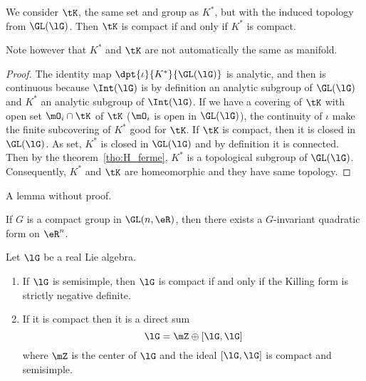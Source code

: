 \begin{proposition}
We consider $\tK$, the same set and group as $K^*$, but with the induced topology from $\GL(\lG)$. Then $\tK$ is compact if and only if $K^*$ is compact.
\end{proposition}

Note however that $K^*$ and $\tK$ are not automatically the same as manifold.

\begin{proof}
The identity map $\dpt{\iota}{K^*}{\GL(\lG)}$ is analytic, and then is continuous because $\Int(\lG)$ is by definition an analytic subgroup of $\GL(\lG)$ and $K^*$ an analytic subgroup of $\Int(\lG)$. If we have a covering of $\tK$ with open set $\mO_i\cap\tK$ of $\tK$ ($\mO_i$ is open in $\GL(\lG)$), the continuity of $\iota$ make the finite subcovering of $K^*$ good for $\tK$.
If $\tK$ is compact, then it is closed in $\GL(\lG)$. As set, $K^*$ is closed in $\GL(\lG)$ and by definition it is connected. Then by the theorem~\ref{tho:H_ferme}, $K^*$ is a topological subgroup of $\GL(\lG)$. Consequently, $K^*$ and $\tK$ are homeomorphic and they have same topology.
\end{proof}

A lemma without proof.
\begin{lemma}
If $G$ is a compact group in $\GL(n,\eR)$, then there exists a $G$-invariant quadratic form on $\eR^n$.
\end{lemma}

\begin{proposition}     \label{ProplGcompactKillNeg}
Let $\lG$ be a real Lie algebra.

\begin{enumerate}
\item If $\lG$ is semisimple, then $\lG$ is compact if and only if  the Killing form is strictly negative definite.
\item If it is compact then it is a direct sum
\begin{equation}
   \lG=\mZ\oplus [\lG,\lG]
\end{equation}
where $\mZ$ is the center of $\lG$ and the ideal $[\lG,\lG]$ is compact and semisimple.
\end{enumerate}
\label{prop:compact_Killing}
\end{proposition}


